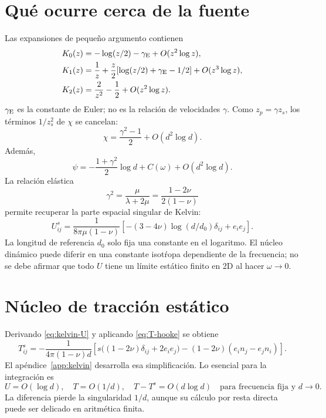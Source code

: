 \documentclass[11pt,a4paper]{report}
\numberwithin{equation}{chapter}
\begin{document}
\section{Qu\'e ocurre cerca de la fuente}
Las expansiones de peque\~no argumento contienen
\begin{align}
 K_0(z)&=-\log(z/2)-\gamma_{\rm E}+O(z^2\log z),\\
 K_1(z)&=\frac1z+\frac z2
          [\log(z/2)+\gamma_{\rm E}-1/2]+O(z^3\log z),\\
 K_2(z)&=\frac2{z^2}-\frac12+O(z^2\log z).
 \label{eq:K-asintoticas}
\end{align}
$\gamma_{\rm E}$ es la constante de Euler; no es la relaci\'on de
velocidades $\gamma$.
Como $z_p=\gamma z_s$, los t\'erminos $1/z_s^2$ de $\chi$ se cancelan:
\begin{equation}
  \chi=\frac{\gamma^2-1}{2}+O(d^2\log d).
  \label{eq:chi-limite}
\end{equation}
Adem\'as,
\begin{equation}
 \psi=-\frac{1+\gamma^2}{2}\log d+C(\omega)
       +O(d^2\log d).
\end{equation}
La relaci\'on el\'astica
\begin{equation}
 \gamma^2=\frac{\mu}{\lambda+2\mu}
          =\frac{1-2\nu}{2(1-\nu)}
\end{equation}
permite recuperar la parte espacial singular de Kelvin:
\begin{equation}
 U^s_{ij}=\frac{1}{8\pi\mu(1-\nu)}
 \left[-(3-4\nu)\log(d/d_0)\delta_{ij}+e_ie_j\right].
 \label{eq:kelvin-U}
\end{equation}
La longitud de referencia $d_0$ solo fija una constante en el logaritmo.
El n\'ucleo din\'amico puede diferir en una constante isot\'ropa
dependiente de la frecuencia; no se debe afirmar que todo $U$ tiene un
l\'imite est\'atico finito en 2D al hacer $\omega\to0$.

\section{N\'ucleo de tracci\'on est\'atico}
Derivando \eqref{eq:kelvin-U} y aplicando
\eqref{eq:T-hooke} se obtiene
\begin{equation}
 \boxed{T^s_{ij}=
 -\frac{1}{4\pi(1-\nu)d}
 \left[s\big((1-2\nu)\delta_{ij}+2e_ie_j\big)
       -(1-2\nu)(e_in_j-e_jn_i)\right].}
 \label{eq:kelvin-T}
\end{equation}
El ap\'endice~\ref{app:kelvin} desarrolla esa simplificaci\'on.
Lo esencial para la integraci\'on es
\begin{equation}
 U=O(\log d),\quad T=O(1/d),\quad
 T-T^s=O(d\log d)
 \quad\text{para frecuencia fija y }d\to0.
 \label{eq:ordenes}
\end{equation}
La diferencia pierde la singularidad $1/d$, aunque su c\'alculo por
resta directa puede ser delicado en aritm\'etica finita.
\end{document}
